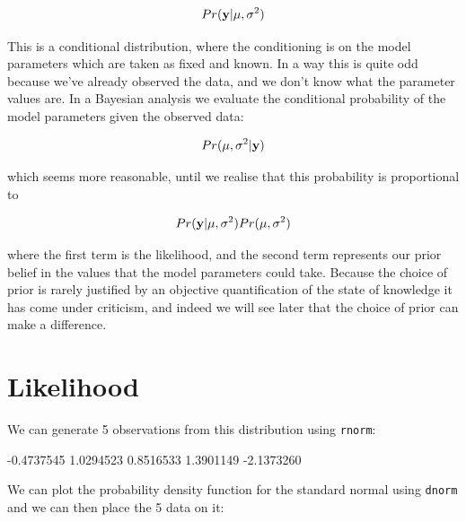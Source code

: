 \documentclass{article}
\begin{document}
\begin{displaymath}
Pr({\bf y} | \mu, \sigma^{2})
\end{displaymath}

This is a conditional distribution, where the conditioning is on the model parameters which are taken as fixed and known. In a way this is quite odd because we've already observed the data, and we don't know what the parameter values are. In a Bayesian analysis we evaluate the conditional probability of the model parameters given the observed data:

\begin{displaymath}
Pr(\mu, \sigma^{2} | {\bf y})
\label{post1-eq}
\end{displaymath}
 
which seems more reasonable, until we realise that this probability is proportional to 

\begin{displaymath}
Pr({\bf y} | \mu, \sigma^{2})Pr(\mu, \sigma^{2})
\end{displaymath}

where the first term is the likelihood, and the second term represents our prior belief in the values that the model parameters could take. Because the choice of prior is rarely justified by an objective quantification of the state of knowledge it has come under criticism, and indeed we will see later that the choice of prior can make a difference. 

\section{Likelihood}

We can generate 5 observations from this distribution using \texttt{rnorm}:

\begin{Schunk}
\begin{Soutput}
[1] -0.4737545  1.0294523  0.8516533  1.3901149 -2.1373260
\end{Soutput}
\end{Schunk}

We can plot the probability density function for the standard normal using \texttt{dnorm} and we can then place the 5 data on it:
\end{document}
